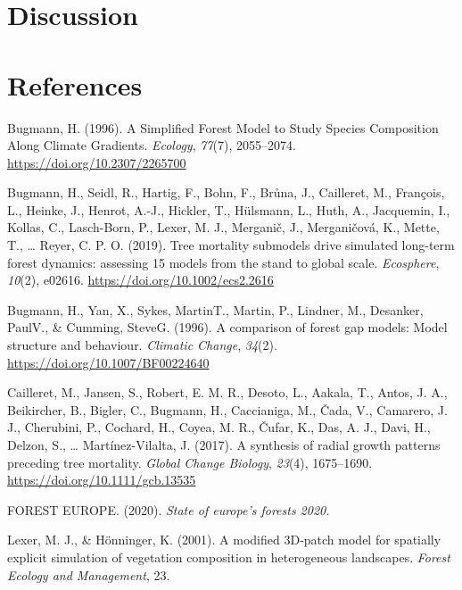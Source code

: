 \documentclass[
  12pt,
]{article}
\newlength{\cslhangindent}
\newlength{\cslentryspacingunit} %
\newenvironment{CSLReferences}[2] %
 {%
  \setlength{\parindent}{0pt}
  \ifodd #1
  \let\oldpar\par
  \def\par{\hangindent=\cslhangindent\oldpar}
  \fi
  \setlength{\parskip}{#2\cslentryspacingunit}
 }%
 {}
\begin{document}
\hypertarget{discussion}{%
\section{Discussion}\label{discussion}}

\hypertarget{references}{%
\section{References}\label{references}}

\hypertarget{refs}{}
\begin{CSLReferences}{1}{0}
\leavevmode{}%
Bugmann, H. (1996). A Simplified Forest Model to Study Species Composition Along Climate Gradients. \emph{Ecology}, \emph{77}(7), 2055--2074. \url{https://doi.org/10.2307/2265700}

\leavevmode{}%
Bugmann, H., Seidl, R., Hartig, F., Bohn, F., Brůna, J., Cailleret, M., François, L., Heinke, J., Henrot, A.-J., Hickler, T., Hülsmann, L., Huth, A., Jacquemin, I., Kollas, C., Lasch-Born, P., Lexer, M. J., Merganič, J., Merganičová, K., Mette, T., \ldots{} Reyer, C. P. O. (2019). Tree mortality submodels drive simulated long-term forest dynamics: assessing 15 models from the stand to global scale. \emph{Ecosphere}, \emph{10}(2), e02616. \url{https://doi.org/10.1002/ecs2.2616}

\leavevmode{}%
Bugmann, H., Yan, X., Sykes, MartinT., Martin, P., Lindner, M., Desanker, PaulV., \& Cumming, SteveG. (1996). A comparison of forest gap models: Model structure and behaviour. \emph{Climatic Change}, \emph{34}(2). \url{https://doi.org/10.1007/BF00224640}

\leavevmode{}%
Cailleret, M., Jansen, S., Robert, E. M. R., Desoto, L., Aakala, T., Antos, J. A., Beikircher, B., Bigler, C., Bugmann, H., Caccianiga, M., Čada, V., Camarero, J. J., Cherubini, P., Cochard, H., Coyea, M. R., Čufar, K., Das, A. J., Davi, H., Delzon, S., \ldots{} Martínez-Vilalta, J. (2017). A synthesis of radial growth patterns preceding tree mortality. \emph{Global Change Biology}, \emph{23}(4), 1675--1690. \url{https://doi.org/10.1111/gcb.13535}

\leavevmode{}%
FOREST EUROPE. (2020). \emph{State of europe{'}s forests 2020.}

\leavevmode{}%
Lexer, M. J., \& Hönninger, K. (2001). A modified 3D-patch model for spatially explicit simulation of vegetation composition in heterogeneous landscapes. \emph{Forest Ecology and Management}, 23.


\end{CSLReferences}
\end{document}
